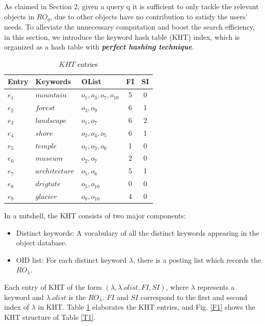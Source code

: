 As claimed in Section 2, given a query q it is sufficient to only tackle the relevant objects in $RO_q$, due to other objects have no contribution to satisfy the users' needs. To alleviate the unnecessary computation and boost the search efficiency, in this section, we introduce the keyword hash table (KHT) index, which is organized as a hash table with \textbf{\textit{perfect hashing technique}}.
\begin{table}
\centering
\begin{tabular}{|l|l|l|c|c|}
\hline
Entry &Keywords & OList & FI & SI \\
\hline \hline
$e_1$ &$mountain$ & $o_1,o_3,o_7,o_{10}$ & 5 & 0\\
\hline
$e_2$ &$forest$ & $o_3,o_9$ & 6 & 1 \\
\hline
$e_3$ &$landscape$ & $o_1,o_7$ & 6 & 2 \\
\hline
$e_4$ &$shore$ & $o_2,o_4,o_5$ & 6 & 1 \\
\hline
$e_5$ &$temple$ & $o_1,o_3,o_6$ & 1 & 0 \\
\hline
$e_6$ &$museum$ & $o_2,o_7$ & 2 & 0 \\
\hline
$e_7$ &$architecture$ & $o_5,o_6$ & 5 & 1 \\
\hline
$e_8$ &$drigtate$ & $o_5,o_{10}$ & 0 & 0 \\
\hline
$e_9$ &$glacier$ & $o_8,o_{10}$ & 4 & 0 \\
\hline
\end{tabular}
\caption{$KHT$ entries}\label{T4}
\end{table}

In a nutshell, the KHT consists of two major components:
\begin{itemize}
    \item Distinct keywords: A vocabulary of all the distinct keywords appearing in the object database.
    \item OID list: For each distinct keyword $\lambda$, there is a posting list which records the $RO_\lambda$.
\end{itemize}

Each entry of KHT of the form $(\lambda,\lambda.olist, FI, SI)$, where $\lambda$ represents a keyword and $\lambda.olist$ is the $RO_\lambda$. $FI$ and $SI$ correspond to the first and second index of $\lambda$ in KHT. Table \ref{T4} elaborates the KHT entries, and Fig. \ref{F1} shows the KHT structure of Table \ref{T1}.


